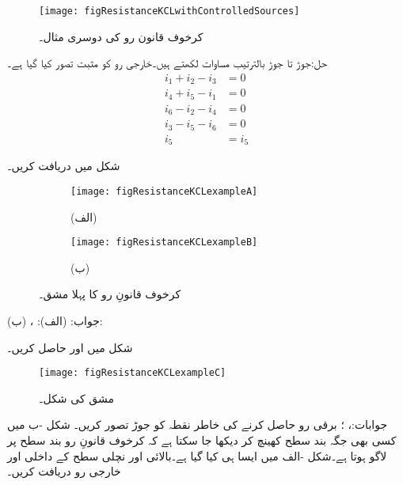 \begin{figure}
\centering
\texttt{[image: figResistanceKCLwithControlledSources]}
\caption{کرخوف قانون رو کی دوسری مثال۔}
\label{شکل_مزاحمتی_کرخوف_قانون_رو_دوسری_مثال}
\end{figure}

حل:جوڑ  تا جوڑ  بالترتیب مساوات لکھتے ہیں۔خارجی رو کو مثبت تصور کیا گیا ہے۔
\begin{align*}
i_1+i_2-i_3&=0\\
i_4+i_5-i_1&=0\\
i_6-i_2-i_4&=0\\
i_3-i_5-i_6&=0\\
i_5&=i_5
\end{align*}
\FloatBarrier

شکل  میں  دریافت کریں۔
\begin{figure}
\centering
\begin{subfigure}{0.5\textwidth}
\centering
\texttt{[image: figResistanceKCLexampleA]}
\caption*{(الف)}
\end{subfigure}%
%
\begin{subfigure}{0.5\textwidth}
\centering
\texttt{[image: figResistanceKCLexampleB]}
\caption*{(ب)}
\end{subfigure}%
\caption{کرخوف قانونِ رو کا پہلا مشق۔}
\label{مشق_مزاحمتی_اکلوتی_مزاحمت}
\end{figure}

جواب: (الف): ، (ب):
\FloatBarrier


شکل  میں  اور  حاصل کریں۔
\begin{figure}[!h]
\centering
\texttt{[image: figResistanceKCLexampleC]}
\caption{مشق  کی شکل۔}
\label{مشق_مزاحمتی_کرخوف_قانون_رو_دوسری_مشق}
\end{figure}

جوابات:، ؛  برقی رو  حاصل کرنے کی خاطر نقطہ  کو جوڑ تصور کریں۔
\FloatBarrier
شکل -ب میں کسی بھی جگہ بند سطح کھینچ کر دیکھا جا سکتا ہے کہ کرخوف قانونِ رو بند سطح پر لاگو ہوتا ہے۔شکل -الف میں ایسا ہی کیا گیا ہے۔بالائی اور نچلی سطح کے داخلی اور خارجی رو دریافت کریں۔

